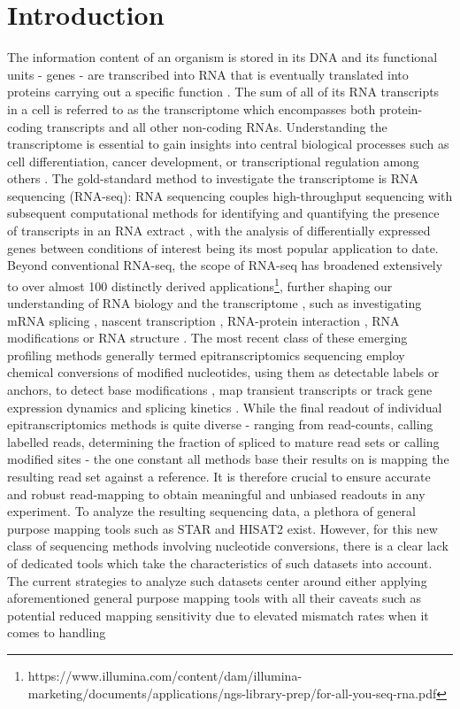 
\chapter{Introduction}

The information content of an organism is stored in its DNA and its functional units - genes - are transcribed into RNA that is eventually translated into proteins carrying out a specific function \citep{Crick1970CentralBiology}. The sum of all of its RNA transcripts in a cell is referred to as the transcriptome which encompasses both protein-coding transcripts and all other non-coding RNAs. Understanding the transcriptome is essential to gain insights into central biological processes such as cell differentiation, cancer development, or transcriptional regulation among others \citep{Wang2009}. The gold-standard method to investigate the transcriptome is RNA sequencing (RNA-seq): RNA sequencing couples high-throughput sequencing with subsequent computational methods for identifying and quantifying the presence of transcripts in an RNA extract \citep{Lowe2017}, with the analysis of differentially expressed genes between conditions of interest being its most popular application to date. Beyond conventional RNA-seq, the scope of RNA-seq has broadened extensively to over almost 100 distinctly derived applications\footnote{https://www.illumina.com/content/dam/illumina-marketing/documents/applications/ngs-library-prep/for-all-you-seq-rna.pdf}, further shaping our understanding of RNA biology and the transcriptome \citep{Stark2019}, such as investigating mRNA splicing \citep{Wang2008}, nascent transcription \citep{Kwak2013}, RNA-protein interaction \citep{Hafner2010}, RNA modifications \citep{Dominissini2012} or RNA structure \citep{Lucks2011}. The most recent class of these emerging profiling methods generally termed epitranscriptomics sequencing \citep{Li2016} employ chemical conversions of modified nucleotides, using them as detectable labels or anchors, to detect base modifications \citep{Schaefer2009}, map transient transcripts \citep{Schwalb2016} or track gene expression dynamics \citep{Herzog2017} and splicing kinetics \citep{Wachutka2019}. While the final readout of individual epitranscriptomics methods is quite diverse - ranging from read-counts, calling labelled reads, determining the fraction of spliced to mature read sets or calling modified sites - the one constant all methods base their results on is mapping the resulting read set against a reference. It is therefore crucial to ensure accurate and robust read-mapping to obtain meaningful and unbiased readouts in any experiment. To analyze the resulting sequencing data, a plethora of general purpose mapping tools such as STAR \citep{Dobin2013} and HISAT2 \citep{Kim2019} exist. However, for this new class of sequencing methods involving nucleotide conversions, there is a clear lack of dedicated tools which take the characteristics of such datasets into account. The current strategies to analyze such datasets center around either applying aforementioned general purpose mapping tools with all their caveats such as potential reduced mapping sensitivity due to elevated mismatch rates when it comes to handling 